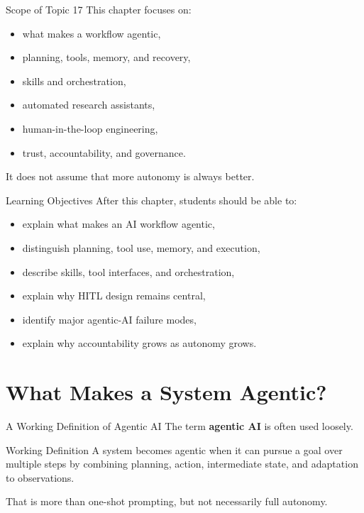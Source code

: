 \documentclass[12pt]{beamer}
\begin{document}
\begin{frame}{Scope of Topic 17}
  This chapter focuses on:
  \begin{itemize}
    \item what makes a workflow agentic,
    \item planning, tools, memory, and recovery,
    \item skills and orchestration,
    \item automated research assistants,
    \item human-in-the-loop engineering,
    \item trust, accountability, and governance.
  \end{itemize}

  It does not assume that more autonomy is always better.
\end{frame}

\begin{frame}{Learning Objectives}
  After this chapter, students should be able to:
  \begin{itemize}
    \item explain what makes an AI workflow agentic,
    \item distinguish planning, tool use, memory, and execution,
    \item describe skills, tool interfaces, and orchestration,
    \item explain why HITL design remains central,
    \item identify major agentic-AI failure modes,
    \item explain why accountability grows as autonomy grows.
  \end{itemize}
\end{frame}

\section{What Makes a System Agentic?}

\begin{frame}{A Working Definition of Agentic AI}
  The term \textbf{agentic AI} is often used loosely.

  \begin{conceptbox}{Working Definition}
    A system becomes agentic when it can pursue a goal over multiple steps by combining planning, action, intermediate state, and adaptation to observations.
  \end{conceptbox}

  That is more than one-shot prompting, but not necessarily full autonomy.
\end{frame}
\end{document}
